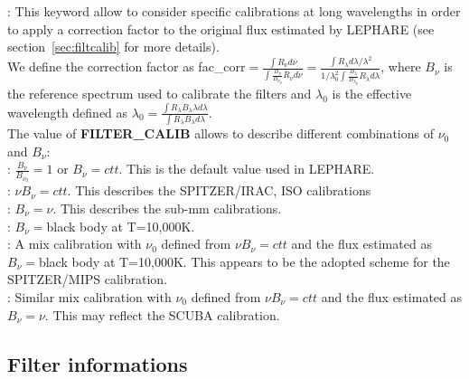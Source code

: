 \documentclass[12pt]{article}
\begin{document}
 : This keyword allow to consider specific calibrations at long 
 wavelengths  in order to apply a correction factor to the original flux estimated by  LEPHARE
 (see section~\ref{sec:filtcalib} for more details). \\
%
 We define the correction factor as
 fac\_corr$=\frac{\int  R_{\nu} d\nu}{\int \frac{B_{\nu}}{B_{\nu_0}} R_{\nu} d\nu}= \frac{\int  R_{\lambda} d\lambda/\lambda^2}{1/\lambda_0^2 \int \frac{B_{\lambda}}{B_{\lambda_0}} R_{\lambda} d\lambda}$, where
 $B_{\nu}$ is the reference spectrum used to calibrate the filters and  $\lambda_0$ is  the effective wavelength defined as  $\lambda_{0}= \frac{\int R_{\lambda} B_{\lambda} \lambda d\lambda}{\int R_{\lambda}  B_{\lambda}  d\lambda}$.\\
The value of {\bf FILTER\_CALIB} allows to describe different combinations of $\nu_0$
 and $B_{\nu}$: \\
   : $\frac{B_{\nu}}{B_{\nu_0}}=1$ or $B_{\nu}=ctt$. 
                              This is the default value used in LEPHARE. \\
   : $\nu B_{\nu}=ctt$.  This describes the SPITZER/IRAC, ISO calibrations\\
   : $B_{\nu}=\nu$. This describes the sub-mm calibrations.\\
   : $B_{\nu}=$black body at T=10,000K. \\
   : A mix calibration with $\nu_0$ defined from
                                                          $\nu B_{\nu}=ctt$ and  the flux estimated as 
                                                          $B_{\nu}=$black body at T=10,000K.  This appears
                                                          to be  the  adopted scheme for the SPITZER/MIPS calibration.\\ 
   : Similar mix calibration with   $\nu_0$ defined from
                                                           $\nu B_{\nu}=ctt$ and the flux estimated as $B_{\nu}=\nu$. 
                                                           This may reflect the SCUBA calibration.                              
%
\subsection{Filter informations} 
%
\end{document}
